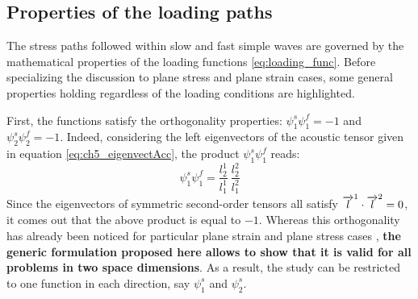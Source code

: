 
\subsection{Properties of the loading paths}
The stress paths followed within slow and fast simple waves are governed by the mathematical properties of the loading functions \eqref{eq:loading_func}.
Before specializing the discussion to plane stress and plane strain cases, some general properties holding regardless of the loading conditions are highlighted.

First, the functions satisfy the orthogonality properties: $\psi^s_1\psi^f_1=-1$ and $\psi^s_2\psi^f_2=-1$.
Indeed, considering the left eigenvectors of the acoustic tensor given in equation \eqref{eq:ch5_eigenvectAcc}, the product $\psi^s_1\psi^f_1$ reads:
\begin{equation*}
  \psi^s_1\psi^f_1 = \frac{l^1_2}{l^1_1}\: \frac{l_2^2}{l^2_1}  
\end{equation*}
Since the eigenvectors of symmetric second-order tensors all satisfy ${\overrightarrow{l}}^1 \cdot {\overrightarrow{l}}^2=0$, it comes out that the above product is equal to $-1$.
Whereas this orthogonality has already been noticed for particular plane strain and plane stress cases \cite{Clifton,Ting68}, \textbf{the generic formulation proposed here allows to show that it is valid for all problems in two space dimensions}. 
As a result, the study can be restricted to one function in each direction, say $\psi_1^s$ and $\psi_2^s$.

